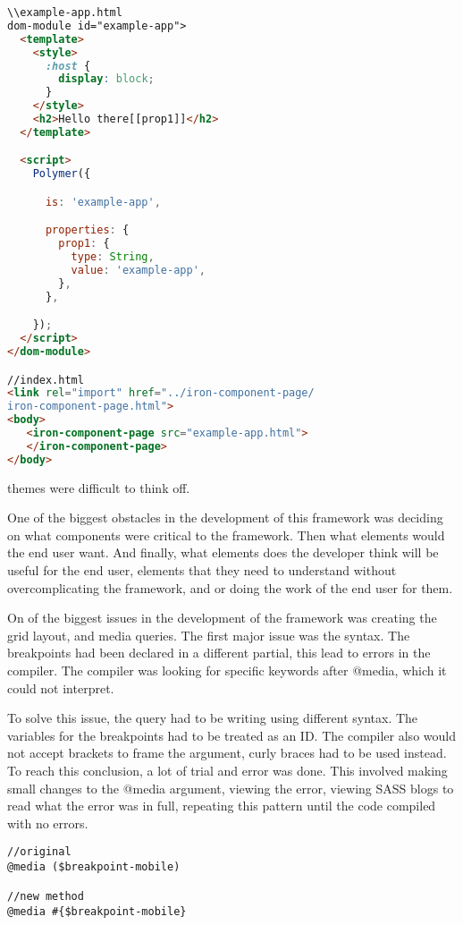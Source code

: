 \begin{lstlisting}[language=HTML]
\\example-app.html
dom-module id="example-app">
  <template>
    <style>
      :host {
        display: block;
      }
    </style>
    <h2>Hello there[[prop1]]</h2>
  </template>

  <script>
    Polymer({

      is: 'example-app',

      properties: {
        prop1: {
          type: String,
          value: 'example-app',
        },
      },

    });
  </script>
</dom-module>

//index.html
<link rel="import" href="../iron-component-page/
iron-component-page.html">
<body>
   <iron-component-page src="example-app.html">
   </iron-component-page>
</body>
\end{lstlisting}

themes were difficult to think off. 

One of the biggest obstacles in the development of this framework was deciding on what components were critical to the framework. Then what elements would the end user want. And finally, what elements does the developer think will be useful for the end user, elements that they need to understand without overcomplicating the framework, and or doing the work of the end user for them.

On of the biggest issues in the development of the framework was creating the grid layout, and media queries. The first major issue was the syntax. The breakpoints had been declared in a different partial, this lead to errors in the compiler. The compiler was looking for specific keywords after @media, which it could not interpret.

To solve this issue, the query had to be writing using different syntax. The variables for the breakpoints had to be treated as an ID. The compiler also would not accept brackets to frame the argument, curly braces had to be used instead. To reach this conclusion, a lot of trial and error was done. This involved making small changes to the @media argument, viewing  the error, viewing \gls{SASS} blogs to read what the error was in full, repeating this pattern until the code compiled with no errors. 
\begin{lstlisting}[language=CSS3]
//original 
@media ($breakpoint-mobile)

//new method
@media #{$breakpoint-mobile} 
\end{lstlisting}

